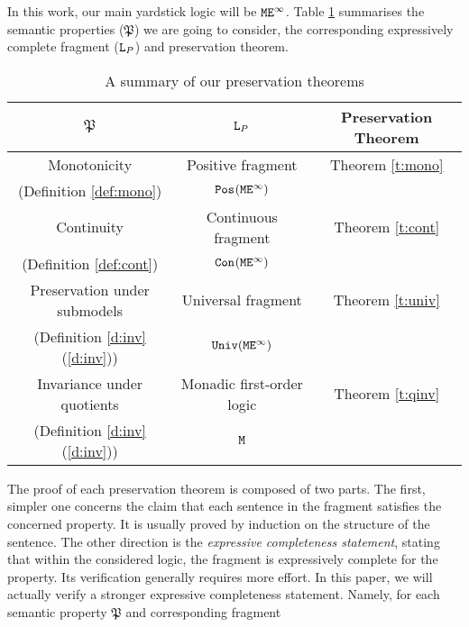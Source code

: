 In this work, our main yardstick logic will be $\mathtt{M}\mathtt{E}^{\infty}$. 
Table \ref{tab:0} summarises the semantic properties
($\mathfrak{P}$) we are going to consider,  
the corresponding expressively complete fragment ($\mathtt{L}_{\relax{P}}$) and preservation theorem.
{\small
\begin{table}[h!]
\begin{center}
\begin{tabular}{|c|c|c|}
\hline
$\mathfrak{P}$				
   & $\mathtt{L}_{\relax{P}}$ 		
   & Preservation Theorem 
\\ \hline \hline
     Monotonicity     
   & Positive fragment         
   & Theorem \ref{t:mono}                        
\\ (Definition \ref{def:mono})		
   & $\mathtt{Pos}_{}(\mathtt{M}\mathtt{E}^{\infty})$
   &
\\ \hline	
     Continuity     
   & Continuous fragment  
   & Theorem \ref{t:cont}            
\\ (Definition \ref{def:cont})       	
   & $\mathtt{Con}_{}(\mathtt{M}\mathtt{E}^{\infty})$        
   &                              
\\\hline
     Preservation under submodels
   & Universal fragment    	 
   &          Theorem \ref{t:univ}                    
\\ (Definition \ref{d:inv}(\ref{d:inv}))    
   &          $\mathtt{Univ}(\mathtt{M}\mathtt{E}^{\infty}){}$          
   &                              
\\ \hline
     Invariance under quotients & Monadic first-order logic
   & Theorem \ref{t:qinv}                 
\\ (Definition \ref{d:inv}(\ref{d:inv}))   	
   & $\mathtt{M}$             	
   &                              
\\\hline
\end{tabular}
\caption{A summary of our preservation theorems}
\label{tab:0}
\end{center}
\end{table}
}
The proof of each  preservation theorem is composed of two parts. 
The first, simpler one concerns 
the claim that each sentence in the fragment satisfies the concerned property. 
It is usually proved  by induction on the structure of the sentence.  
The other direction is the  \emph{expressive completeness statement}, stating 
that within the considered logic, the fragment is expressively complete for the 
property. 
Its verification generally requires more effort. 
In this paper, we will actually verify a stronger expressive completeness 
statement. 
Namely, for each semantic property $\mathfrak{P}$ and corresponding fragment
